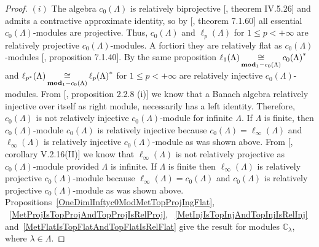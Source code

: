 \begin{proof} $(i)$ The algebra $c_0(\Lambda)$ is relatively biprojective
[\cite{HelHomolBanTopAlg}, theorem IV.5.26] and admits a contractive approximate
identity, so by [\cite{HelBanLocConvAlg}, theorem 7.1.60] all essential
$c_0(\Lambda)$-modules are projective. Thus, $c_0(\Lambda)$ and $\ell_p(\Lambda)$
for $1\leq p<+\infty$ are relatively projective $c_0(\Lambda)$-modules. A
fortiori they are relatively flat as $c_0(\Lambda)$-modules
[\cite{HelBanLocConvAlg}, proposition 7.1.40]. By the same proposition
$\ell_1(\Lambda)\mathop{\mathbin{\cong}}\limits_{\mathbf{mod}_1-c_0(\Lambda)}{c_0(\Lambda)}^*$ and
$\ell_{p^*}(\Lambda)\mathop{\mathbin{\cong}}\limits_{\mathbf{mod}_1-c_0(\Lambda)}{\ell_p(\Lambda)}^*$ for
$1\leq p<+\infty$ are relatively injective $c_0(\Lambda)$-modules. From
[\cite{RamsHomPropSemgroupAlg}, proposition 2.2.8 (i)] we know that a Banach
algebra relatively injective over itself as right module, necessarily has a left
identity. Therefore, $c_0(\Lambda)$ is not relatively injective
$c_0(\Lambda)$-module for infinite $\Lambda$. If $\Lambda$ is finite, then
$c_0(\Lambda)$-module $c_0(\Lambda)$ is relatively injective because
$c_0(\Lambda)=\ell_\infty(\Lambda)$ and $\ell_\infty(\Lambda)$ is relatively
injective $c_0(\Lambda)$-module as was shown above. From
[\cite{HelHomolBanTopAlg}, corollary V.2.16(II)] we know that
$\ell_\infty(\Lambda)$ is not relatively projective as $c_0(\Lambda)$-module
provided $\Lambda$ is infinite. If $\Lambda$ is finite then
$\ell_\infty(\Lambda)$ is relatively projective $c_0(\Lambda)$-module because
$\ell_\infty(\Lambda)=c_0(\Lambda)$ and $c_0(\Lambda)$ is relatively projective
$c_0(\Lambda)$-module as was shown above.
Propositions~\ref{OneDimlInftyc0ModMetTopProjIngFlat},
~\ref{MetProjIsTopProjAndTopProjIsRelProj},
~\ref{MetInjIsTopInjAndTopInjIsRelInj}
and~\ref{MetFlatIsTopFlatAndTopFlatIsRelFlat} give the result for modules
$\mathbb{C}_\lambda$, where $\lambda\in\Lambda$.


\end{proof}
